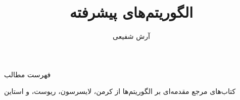 \documentclass[aspectratio=169]{beamer}
\title{الگوریتم‌های پیشرفته}
\author{آرش شفیعی}
\institute{\texttt{[image: logos/ui.png]}}
\date{}
\begin{document}
\begin{frame}[plain]
	\maketitle
\end{frame}

\setcounter{framenumber}{0}
\raggedleft

\begin{frame}{فهرست مطالب}
\begin{flushright}
	\tableofcontents
\end{flushright}
\end{frame}

\begin{itemframe}{کتاب‌های مرجع}
\itm
مقدمه‌ای بر الگوریتم‌ها از کرمن، لایسرسون، ریوست، و استاین
\end{itemframe}


\end{document}
